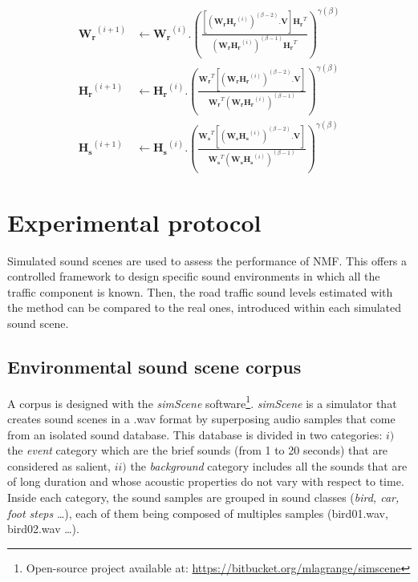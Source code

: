 \documentclass[twocolumn,a4paper,10pt]{article}
\begin{document}
{\scriptsize
\begin{subequations}\label{eq:WH-SSupdate}
\begin{align}
\mathbf{W_r}^{(i+1)} &\leftarrow \mathbf{W_r}^{(i)}.\left(\frac{\left[\left(\mathbf{W_r H_r}^{(i)} \right)^{(\beta-2)}.\mathbf{V} \right]\mathbf{H_r}^T}{\left(\mathbf{W_r H_r}^{(i)} \right)^{(\beta-1)}\mathbf{H_r}^T}\right)^{\gamma(\beta)}\label{eq:W_r_SS}\\
\mathbf{H_r}^{(i+1)} &\leftarrow \mathbf{H_r}^{(i)}.\left(\frac{\mathbf{W_r}^T \left[\left(\mathbf{W_r H_r}^{(i)} \right)^{(\beta-2)}.\mathbf{V} \right]}{\mathbf{W_r}^T \left(\mathbf{W_r H_r}^{(i)} \right)^{(\beta-1)}}\right)^{\gamma(\beta)}\label{eq:H_r_SS}\\
\mathbf{H_s}^{(i+1)} &\leftarrow \mathbf{H_s}^{(i)}.\left(\frac{\mathbf{W_s}^T \left[\left(\mathbf{W_s H_s}^{(i)} \right)^{(\beta-2)}.\mathbf{V} \right]}{\mathbf{W_s}^T \left(\mathbf{W_s H_s}^{(i)} \right)^{(\beta-1)}}\right)^{\gamma(\beta)}\label{eq:H_s_SS}
\end{align}
\end{subequations}}


\section{Experimental protocol}\label{part:protocol}

Simulated sound scenes are used to assess the performance of NMF. This offers a controlled framework to design specific sound environments in which all the traffic component is known. Then, the road traffic sound levels estimated with the method can be compared to the real ones, introduced within each simulated sound scene.

\subsection{Environmental sound scene corpus}

A corpus is designed with the \textit{simScene} software\footnote{Open-source project available at: \url{https://bitbucket.org/mlagrange/simscene}}. \textit{simScene} \cite{rossignol_simscene:_2015} is a simulator that creates sound scenes in a .wav format by superposing audio samples that come from an isolated sound database. This database is divided in two categories: $i)$ the \textit{event} category which are the brief sounds (from 1 to 20 seconds) that are considered as salient, $ii)$ the \textit{background} category includes all the sounds that are of long duration and whose acoustic properties do not vary with respect to time. Inside each category, the sound samples are grouped in sound classes (\textit{bird, car, foot steps} \dots), each of them being composed of multiples samples (bird01.wav, bird02.wav \dots).
\end{document}

